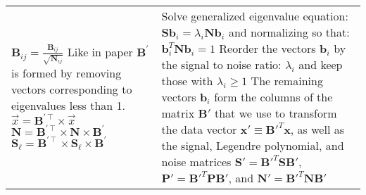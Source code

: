 \documentclass{article}
\newcommand{\TRANSPOSE}[0] {\intercal}
\begin{document}
\begin{longtable}{@{\extracolsep{\fill}}p{}
                                         p{}@{}}
$\mathbf{B}_{ij}=\frac{\mathbf{B}_{ij}}{\sqrt{\mathbf{N}_{ij}}}$ \newline
Like in paper $\mathbf{B}^{\prime}$ is formed by removing vectors corresponding to eigenvalues less than 1. \newline
$\vec{x}=\mathbf{B}^{\prime\TRANSPOSE}\times \vec{x}$ \newline
$\mathbf{N}=\mathbf{B}^{\prime\TRANSPOSE}\times\mathbf{N}\times\mathbf{B}^{\prime}$ \newline
$\mathbf{S_\ell}=\mathbf{B}^{\prime\TRANSPOSE}\times\mathbf{S_\ell}\times\mathbf{B}^{\prime}$ \newline
 
& %
Solve generalized eigenvalue equation: \newline
$\mathbf{Sb}_{i} = \lambda_{i} \mathbf{Nb}_i$ \newline
and normalizing so that: \newline
$\mathbf{b}^{T}_{i} \mathbf{Nb}_{i} = 1$ \newline
Reorder the vectors $\mathbf{b}_{i}$ by the signal to noise ratio: $\lambda_{i}$ and keep those with $\lambda_{i} \ge 1$ \newline
The remaining vectors $\mathbf{b}_{i}$ form the columns of the matrix $\mathbf{B}'$ that we use to transform the data vector $\mathbf{x}' \equiv \mathbf{B}'^{T} \mathbf{x}$, 
as well as the signal, Legendre polynomial, and noise matrices $\mathbf{S}' = \mathbf{B}'^{T} \mathbf{SB}'$, 
$\mathbf{P}' = \mathbf{B}'^{T} \mathbf{PB}'$, and $\mathbf{N}' = \mathbf{B}'^{T} \mathbf{NB}'$

\\ %



\end{longtable}
\end{document}
